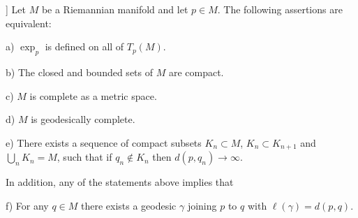 \begin{theorem}[Hopf and Rinow [HR]]
  \label{thm:dc-ch7-2-8}
  \leanok
  Let $M$ be a Riemannian manifold and let $p\in M$. The following assertions are
  equivalent:
  
  a) $\exp_p$ is defined on all of $T_p(M)$.
  
  b) The closed and bounded sets of $M$ are compact.
  
  c) $M$ is complete as a metric space.
  
  d) $M$ is geodesically complete.
  
  e) There exists a sequence of compact subsets $K_n\subset M$, $K_n\subset K_{n+1}$
     and $\bigcup_n K_n=M$, such that if $q_n\notin K_n$ then $d(p,q_n)\to\infty$.
  
  In addition, any of the statements above implies that
  
  f) For any $q\in M$ there exists a geodesic $\gamma$ joining $p$ to $q$ with
     $\ell(\gamma)=d(p,q)$.
\end{theorem}
